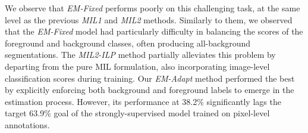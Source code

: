 \begin{table}[tbp!]
  \centering
  \caption{DeepLab-CRF VOC 2012 \textsl{val} IOU (\%) results
    using both strong pixel-level and weak image-level annotations
    ().}
  \label{tab:strong_weak_annot}
  \vspace{-0.5cm}
\end{table}

We observe that \textsl{EM-Fixed} performs poorly on this challenging
task, at the same level as the previous \textsl{MIL1} and \textsl{MIL2}
methods. Similarly to them, we observed that the \textsl{EM-Fixed}
model had particularly difficulty in balancing the scores of the
foreground and background classes, often producing all-background
segmentations. The \textsl{MIL2-ILP} method partially alleviates this
problem by departing from the pure MIL formulation, also incorporating
image-level classification scores during training. Our
\textsl{EM-Adapt} method performed the best by explicitly
enforcing both background and foreground labels to emerge in the
estimation process. However, its performance at 38.2\% significantly
lags the target 63.9\% goal of the strongly-supervised model trained
on pixel-level annotations.


